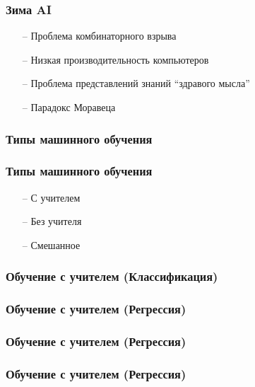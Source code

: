 \documentclass[12pt]{beamer}
\begin{document}
\begin{frame}\frametitle{Зима AI}
\begin{itemize}
  \item[--] Проблема комбинаторного взрыва
  \item[--] Низкая производительность компьютеров
  \item[--] Проблема представлений знаний “здравого мысла”
  \item[--] Парадокс Моравеца
\end{itemize}
\end{frame}

\begin{frame}\frametitle{Типы машинного обучения}
\end{frame}

\begin{frame}\frametitle{Типы машинного обучения}
\begin{itemize}
  \item[--] С учителем
  \item[--] Без учителя
  \item[--] Смешанное
\end{itemize}
\end{frame}

\begin{frame}\frametitle{Обучение с учителем (Классификация)}
\begin{figure}[htbp]
\centering
  
\end{figure}
\end{frame}

\begin{frame}\frametitle{Обучение с учителем (Регрессия)}
\begin{figure}[htbp]
\centering
  
\end{figure}
\end{frame}

\begin{frame}\frametitle{Обучение с учителем (Регрессия)}
\begin{figure}[htbp]
\centering
  
\end{figure}
\end{frame}

\begin{frame}\frametitle{Обучение с учителем (Регрессия)}
\begin{figure}[htbp]
\centering
  
\end{figure}
\end{frame}
\end{document}
